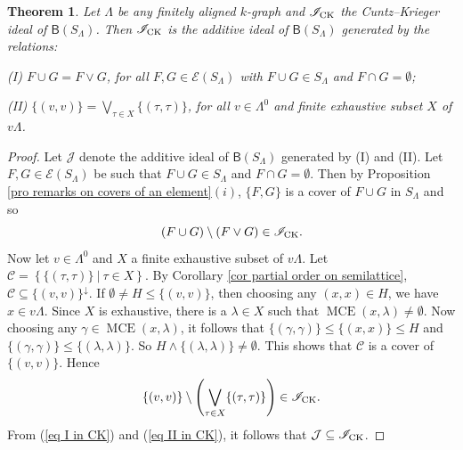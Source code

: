 \documentclass[a4paper,reqno,11pt]{amsart}
\numberwithin{equation}{section}
\newtheorem{thm}{Theorem}[section]
\theoremstyle{definition}
\theoremstyle{remark}
\newcommand{\MCE}{\operatorname{MCE}}
\begin{document}
\begin{thm}\label{th description of Cuntz-Krieger ideal}
Let $\Lambda$ be any finitely aligned $k$-graph and $\mathscr{I}_{\textup{CK}}$ the Cuntz--Krieger ideal of $\mathsf{B}(S_\Lambda)$. Then $\mathscr{I}_{\textup{CK}}$ is the additive ideal of $\mathsf{B}(S_\Lambda)$ generated by the relations:

\textup{(I)} $F\cup G=F\vee G$, for all $F,G\in \mathcal{E}(S_\Lambda)$ with $F\cup G\in S_\Lambda$ and $F\cap G=\emptyset$;

\textup{(II)} $\{(v,v)\}=\displaystyle{\bigvee_{\tau\in X}} \{(\tau,\tau)\}$, for all $v\in \Lambda^0$ and finite exhaustive subset $X$ of $v\Lambda$.
\end{thm}
\begin{proof}
Let $\mathcal{J}$ denote the additive ideal of $\mathsf{B}(S_\Lambda)$ generated by (I) and (II). Let $F,G\in \mathcal{E}(S_\Lambda)$ be such that $F\cup G\in S_\Lambda$ and $F\cap G=\emptyset$. Then by Proposition \ref{pro remarks on covers of an element}$(i)$, $\{F,G\}$ is a cover of $F\cup G$ in $S_\Lambda$ and so 
\begin{equation}\label{eq I in CK}
(F\cup G)\setminus (F\vee G)\in \mathscr{I}_{\textup{CK}}.    
\end{equation}
Now let $v\in \Lambda^0$ and $X$ a finite exhaustive subset of $v\Lambda$. Let $\mathcal{C}=\left\{\{(\tau,\tau)\}~|~\tau\in X\right\}$. By Corollary \ref{cor partial order on semilattice}, $\mathcal{C}\subseteq \{(v,v)\}^{\downarrow}$. If $\emptyset\neq H\le \{(v,v)\}$, then choosing any $(x,x)\in H$, we have $x\in v\Lambda$. Since $X$ is exhaustive, there is a $\lambda\in X$ such that $\MCE(x,\lambda)\neq \emptyset$. Now choosing any $\gamma\in \MCE(x,\lambda)$, it follows that $\{(\gamma,\gamma)\}\le \{(x,x)\}\le H$ and $\{(\gamma,\gamma)\}\le \{(\lambda,\lambda)\}$. So $H\wedge \{(\lambda,\lambda)\}\neq \emptyset$. This shows that $\mathcal{C}$ is a cover of $\{(v,v)\}$. Hence 
\begin{equation}\label{eq II in CK}
\{(v,v)\}\setminus \left(\displaystyle{\bigvee_{\tau\in X}}\{(\tau,\tau)\}\right)\in \mathscr{I}_{\textup{CK}}.   
\end{equation}
From (\ref{eq I in CK}) and (\ref{eq II in CK}), it follows that $\mathcal{J}\subseteq \mathscr{I}_{\textup{CK}}$.
 

\end{proof}
\end{document}
